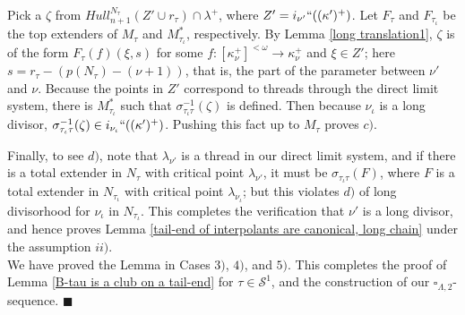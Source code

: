 \documentclass[12pt]{article}
\begin{document}
Pick a $\zeta$ from $Hull_{n+1}^{N_\tau} ( Z' \cup r_\tau ) \cap \lambda^+$, where $Z' = i_{\nu'}`` ( (\kappa')^+)$.  Let $F_\tau$ and $F_{\tau_\iota}$ be the top extenders of $M_\tau$ and $M_{\tau_\iota}^*$, respectively.  By Lemma \ref{long translation1}, $\zeta$ is of the form $F_\tau (f) ( \xi , s )$ for some $f : [\kappa_\nu^+]^{< \omega} \longrightarrow \kappa_\nu^+$ and $\xi \in Z'$; here $s = r_\tau - (p(N_\tau) - (\nu + 1))$, that is, the part of the parameter between $\nu'$ and $\nu$.  Because the points in $Z'$ correspond to threads through the direct limit system, there is $M_{\tau_\iota}^*$ such that $\sigma_{\tau_\iota \tau}^{-1}(\zeta)$ is defined.  Then because $\nu_\iota$ is a long divisor, $\sigma_{\tau_\iota \tau}^{-1}(\zeta) \in  i_{\nu_\iota}`` ( (\kappa')^+)$.  Pushing this fact up to $M_\tau$ proves $c)$.






Finally, to see $d)$, note that $\lambda_{\nu'}$ is a thread in our direct limit system, and if there is a total extender in $N_\tau$ with critical point $\lambda_{\nu'}$, it must be $\sigma_{\tau_\iota \tau} (F)$, where $F$ is a total extender in $N_{\tau_\iota}$ with critical point $\lambda_{\nu_\iota}$; but this violates $d)$ of long divisorhood for $\nu_\iota$ in $N_{\tau_\iota}$.  This completes the verification that $\nu'$ is a long divisor, and hence proves Lemma \ref{tail-end of interpolants are canonical, long chain} under the assumption $ii)$.\\



We have proved the Lemma in Cases $3)$, $4)$, and $5)$.  This completes the proof of Lemma \ref{B-tau is a club on a tail-end} for $\tau \in \mathcal{S}^1$, and the construction of our $\square_{\Lambda , 2}$-sequence.  $\blacksquare$\\








\bigskip
\bigskip
\end{document}
